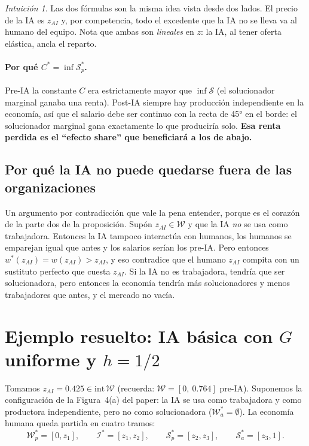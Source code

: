 \documentclass[11pt]{article}
\theoremstyle{definition}
\theoremstyle{remark}
\newtheorem*{intuicion}{Intuición}
\newcommand{\zai}{z_{AI}}
\newcommand{\W}{\mathcal W}
\newcommand{\Sset}{\mathcal S}
\newcommand{\I}{\mathcal I}
\begin{document}
\begin{intuicion}
Las dos fórmulas son la misma idea vista desde dos lados. El precio de la IA es $\zai$ y, por
competencia, todo el excedente que la IA no se lleva va al humano del equipo. Nota que ambas son
\emph{lineales} en $z$: la IA, al tener oferta elástica, ancla el reparto.
\end{intuicion}

\paragraph{Por qué $C^{*}=\inf \Sset_p^{*}$.}
Pre-IA la constante $C$ era estrictamente mayor que $\inf\Sset$ (el solucionador marginal ganaba una
renta). Post-IA siempre hay producción independiente en la economía, así que el salario debe ser
continuo con la recta de 45° en el borde: el solucionador marginal gana exactamente lo que produciría
solo. \textbf{Esa renta perdida es el ``efecto share'' que beneficiará a los de abajo.}

\subsection{Por qué la IA no puede quedarse fuera de las organizaciones}

Un argumento por contradicción que vale la pena entender, porque es el corazón de la parte dos de la
proposición. Supón $\zai\in\W$ y que la IA \emph{no} se usa como trabajadora. Entonces la IA tampoco
interactúa con humanos, los humanos se emparejan igual que antes y los salarios serían los pre-IA. Pero
entonces $w^{*}(\zai)=w(\zai)>\zai$, y eso contradice que el humano $\zai$ compita con un sustituto
perfecto que cuesta $\zai$. Si la IA no es trabajadora, tendría que ser solucionadora, pero entonces la
economía tendría más solucionadores y menos trabajadores que antes, y el mercado no vacía.

\section{Ejemplo resuelto: IA básica con \texorpdfstring{$G$ uniforme y $h=1/2$}{G uniforme y h=1/2}}

Tomamos $\zai=0.425\in\text{int}\,\W$ (recuerda: $\W=[0,\ 0.764]$ pre-IA). Suponemos la configuración de
la Figura~4(a) del paper: la IA se usa como trabajadora y como productora independiente, pero no como
solucionadora ($\W_a^{*}=\emptyset$). La economía humana queda partida en cuatro tramos:
\[
  \W_p^{*}=[0,z_1],\qquad \I^{*}=[z_1,z_2],\qquad \Sset_p^{*}=[z_2,z_3],\qquad \Sset_a^{*}=[z_3,1].
\]
\end{document}
